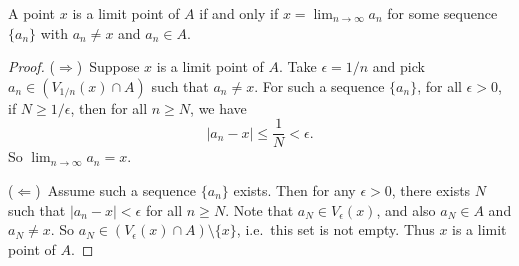 \begin{theorem}
  \label{thm:limit-point}
  A point $x$ is a limit point of $A$ if and only
  if $x = \lim_{n \to \infty} a_n$ for some
  sequence $\{a_n\}$ with $a_n \ne x$ and $a_n \in A$.
\end{theorem}

\begin{proof}
  ($\Rightarrow$)\, Suppose $x$ is a limit point of $A$.
  Take $\epsilon = 1 / n$ and pick
  $a_n \in (V_{1 / n}(x) \cap A)$ such that $a_n \ne x$.
  For such a sequence $\{a_n\}$, for all $\epsilon > 0$,
  if $N \ge 1 / \epsilon$, then for all $n \ge N$,
  we have
  \[|a_n - x| \le \frac{1}{N} < \epsilon.\]
  So $\lim_{n \to \infty} a_n = x$.

  ($\Leftarrow$)\, Assume such a sequence $\{a_n\}$ exists.
  Then for any $\epsilon > 0$, there exists $N$
  such that $|a_n - x| < \epsilon$ for all $n \ge N$.
  Note that $a_N \in V_\epsilon(x)$, and also
  $a_N \in A$ and $a_N \ne x$. So
  $a_N \in (V_\epsilon(x) \cap A) \setminus \{x\}$,
  i.e.~this set is not empty. Thus $x$ is a limit point
  of $A$.
\end{proof}
